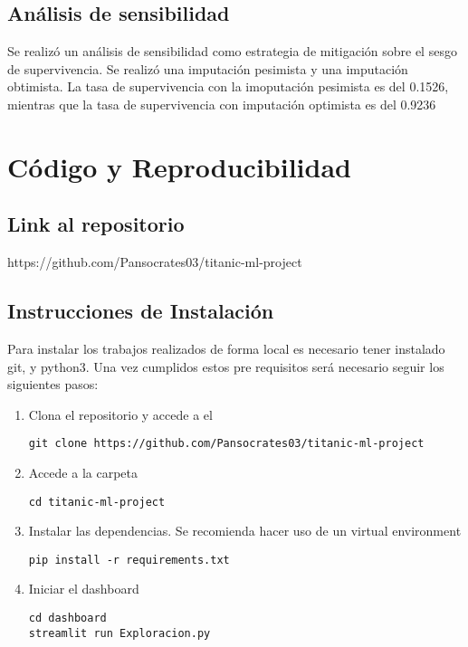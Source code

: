 \documentclass[conference]{IEEEtran}
\begin{document}
\subsection{Análisis de sensibilidad}

Se realizó un análisis de sensibilidad como estrategia de mitigación sobre el sesgo de supervivencia. Se realizó una imputación pesimista y una imputación obtimista. La tasa de supervivencia con la imoputación pesimista es del 0.1526, mientras que la tasa de supervivencia con imputación optimista es del 0.9236

\section{Código y Reproducibilidad}
\subsection{Link al repositorio}
https://github.com/Pansocrates03/titanic-ml-project
\subsection{Instrucciones de Instalación}
Para instalar los trabajos realizados de forma local es necesario tener instalado git, y python3. Una vez cumplidos estos pre requisitos será necesario seguir los siguientes pasos:

\begin{enumerate}
    \item Clona el repositorio y accede a el
\begin{verbatim}
git clone https://github.com/Pansocrates03/titanic-ml-project
\end{verbatim}
    \item Accede a la carpeta
\begin{verbatim}
cd titanic-ml-project
\end{verbatim}
    \item Instalar las dependencias. Se recomienda hacer uso de un virtual environment
\begin{verbatim}
pip install -r requirements.txt
\end{verbatim}
    \item Iniciar el dashboard
\begin{verbatim}
cd dashboard
streamlit run Exploracion.py
\end{verbatim}

\end{enumerate}
\end{document}
